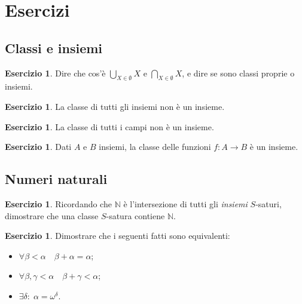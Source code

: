 \documentclass[a4paper,10pt,oneside]{article}
\theoremstyle{plain}
\theoremstyle{definition}
\newtheorem{myex}[mytheorem]{Esercizio}
\theoremstyle{remark}
\begin{document}
\section{Esercizi}
\subsection{Classi e insiemi}
\begin{myex}
 Dire che cos'è $\bigcup_{X\in \emptyset} X$ e $\bigcap_{X\in \emptyset} X$, e dire se sono classi proprie o insiemi.
\end{myex}
\begin{myex}
 La classe di tutti gli insiemi non è un insieme.
\end{myex}
\begin{myex}
 La classe di tutti i campi non è un insieme.
\end{myex}


\begin{myex}
 Dati $A$ e $B$ insiemi, la classe delle funzioni $f: A\rightarrow B$ è un insieme.
\end{myex}

\subsection{Numeri naturali}
\begin{myex}\label{ex:classisature}
 Ricordando che $\mathbb N$ è l'intersezione di tutti gli \emph{insiemi} $S$-saturi, dimostrare che una classe $S$-satura contiene $\mathbb N$.
\end{myex}



\begin{myex} Dimostrare che i seguenti fatti sono equivalenti:
\begin{itemize}
 \item $\forall \beta < \alpha \quad \beta + \alpha=\alpha$;
 \item $\forall \beta,\gamma <\alpha \quad \beta +\gamma <\alpha$;
 \item $\exists \delta: \; \alpha=\omega^\delta$.
\end{itemize}
\end{myex}

\end{document}
